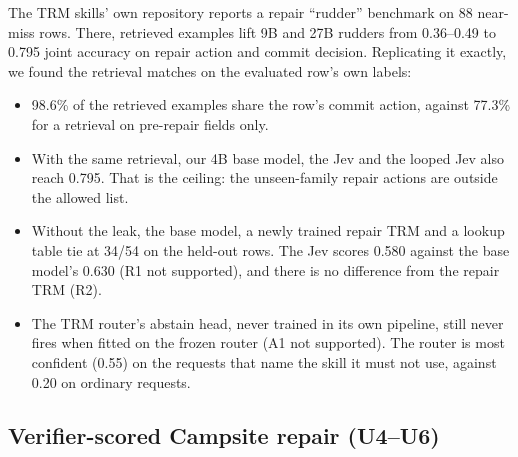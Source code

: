 \documentclass[11pt]{article}
\begin{document}
The TRM skills' own repository reports a repair ``rudder'' benchmark on 88 near-miss rows. There,
retrieved examples lift 9B and 27B rudders from 0.36--0.49 to 0.795 joint accuracy on repair action
and commit decision. Replicating it exactly, we found the retrieval matches on the evaluated row's
own labels:
\begin{itemize}
  \item 98.6\% of the retrieved examples share the row's commit action, against 77.3\% for a
  retrieval on pre-repair fields only.
  \item With the same retrieval, our 4B base model, the Jev and the looped Jev also reach 0.795.
  That is the ceiling: the unseen-family repair actions are outside the allowed list.
  \item Without the leak, the base model, a newly trained repair TRM and a lookup table tie at
  34/54 on the held-out rows. The Jev scores 0.580 against the base model's 0.630 (R1 not
  supported), and there is no difference from the repair TRM (R2).
  \item The TRM router's abstain head, never trained in its own pipeline, still never fires when
  fitted on the frozen router (A1 not supported). The router is most confident (0.55) on the
  requests that name the skill it must not use, against 0.20 on ordinary requests.
\end{itemize}

\subsection{Verifier-scored Campsite repair (U4--U6)}
\end{document}
